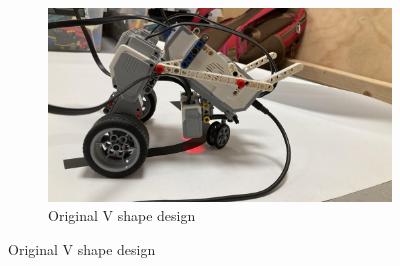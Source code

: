 \documentclass{article}
\begin{document}
\begin{figure}[!htbp]
	\centering

	\begin{subfigure}{\textwidth}
		\includegraphics[width=\textwidth]{./figures/old-v-shape.jpeg}
		\caption{Original V shape design}%
	\end{subfigure}
	
	\vspace{\baselineskip}


\end{figure}
\end{document}
